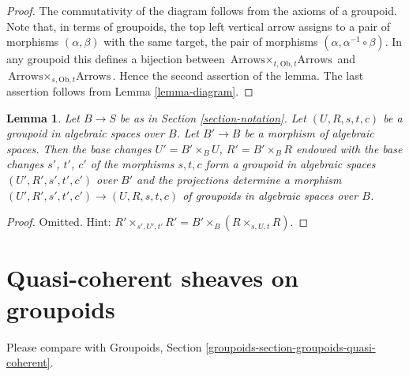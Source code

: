 \documentclass{stacks-project}
\theoremstyle{plain}
\newtheorem{lemma}[subsection]{Lemma}
\theoremstyle{definition}
\theoremstyle{remark}
\numberwithin{equation}{subsection}
\begin{document}
\begin{proof}
The commutativity of the diagram follows from the axioms of a groupoid.
Note that, in terms of groupoids, the top left vertical arrow assigns to
a pair of morphisms $(\alpha, \beta)$ with the same target, the pair
of morphisms $(\alpha, \alpha^{-1} \circ \beta)$. In any groupoid
this defines a bijection between
$\text{Arrows} \times_{t, \text{Ob}, t} \text{Arrows}$
and
$\text{Arrows} \times_{s, \text{Ob}, t} \text{Arrows}$. Hence the second
assertion of the lemma.
The last assertion follows from Lemma \ref{lemma-diagram}.
\end{proof}

\begin{lemma}
\label{lemma-base-change-groupoid}
Let $B \to S$ be as in Section \ref{section-notation}.
Let $(U, R, s, t, c)$ be a groupoid in algebraic spaces over $B$.
Let $B' \to B$ be a morphism of algebraic spaces.
Then the base changes $U' = B' \times_B U$,
$R' = B' \times_B R$ endowed with the base changes $s'$, $t'$, $c'$
of the morphisms $s, t, c$ form a groupoid in algebraic spaces
$(U', R', s', t', c')$ over $B'$ and the projections
determine a morphism
$(U', R', s', t', c') \to (U, R, s, t, c)$
of groupoids in algebraic spaces over $B$.
\end{lemma}

\begin{proof}
Omitted. Hint:
$R' \times_{s', U', t'} R' = B' \times_B (R \times_{s, U, t} R)$.
\end{proof}





\section{Quasi-coherent sheaves on groupoids}
\label{section-groupoids-quasi-coherent}

\noindent
Please compare with
Groupoids, Section \ref{groupoids-section-groupoids-quasi-coherent}.
\end{document}
